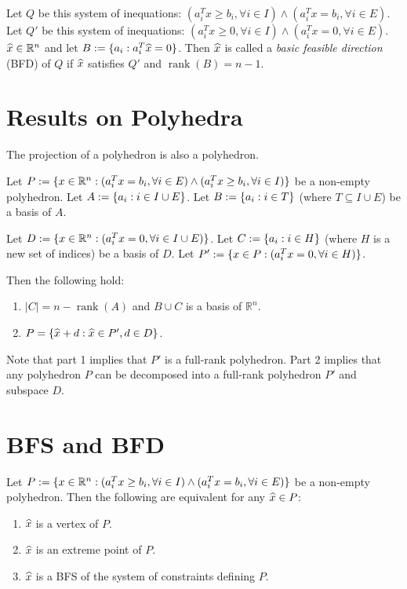 \documentclass[a4paper, 12pt, fleqn]{article}
\newenvironment*{tightenum}{\begin{enumerate}[noitemsep]}{\end{enumerate}}
\DeclareMathOperator{\rank}{rank}
\begin{document}
\begin{definition}[BFD]
Let $Q$ be this system of inequations:
$(a_i^Tx \ge b_i, \forall i \in I) \wedge (a_i^Tx = b_i, \forall i \in E)$.
Let $Q'$ be this system of inequations:
$(a_i^Tx \ge 0, \forall i \in I) \wedge (a_i^Tx = 0, \forall i \in E)$.
$\widehat{x} \in \mathbb{R}^n$ and let $B := \{a_i: a_i^T\widehat{x} = 0\}$.
Then $\widehat{x}$ is called a \emph{basic feasible direction} (BFD) of $Q$ if
$\widehat{x}$ satisfies $Q'$ and $\rank(B) = n-1$.
\end{definition}

\section{Results on Polyhedra}

\begin{theorem}
\label{thm:fme}
The projection of a polyhedron is also a polyhedron.
\end{theorem}

\begin{theorem}
Let $P := \{x \in \mathbb{R}^n: (a_i^Tx = b_i, \forall i \in E) \wedge (a_i^Tx \ge b_i, \forall i \in I)\}$
be a non-empty polyhedron. Let $A := \{a_i: i \in I \cup E\}$.
Let $B := \{a_i: i \in T\}$ (where $T \subseteq I \cup E$) be a basis of $A$.

Let $D := \{x \in \mathbb{R}^n: (a_i^Tx = 0, \forall i \in I \cup E)\}$.
Let $C := \{a_i: i \in H\}$ (where $H$ is a new set of indices) be a basis of $D$.
Let $P' := \{x \in P: (a_i^Tx = 0, \forall i \in H)\}$.

Then the following hold:
\begin{tightenum}
\item $|C| = n - \rank(A)$ and $B \cup C$ is a basis of $\mathbb{R}^n$.
\item $P = \{\widehat{x} + d: \widehat{x} \in P', d \in D\}$.
\end{tightenum}

Note that part 1 implies that $P'$ is a full-rank polyhedron.
Part 2 implies that any polyhedron $P$ can be decomposed into a full-rank polyhedron $P'$ and subspace $D$.
\end{theorem}

\section{BFS and BFD}

\begin{theorem}
Let $P := \{x \in \mathbb{R}^n: (a_i^Tx \ge b_i, \forall i \in I) \wedge (a_i^Tx = b_i, \forall i \in E)\}$
be a non-empty polyhedron. Then the following are equivalent for any $\widehat{x} \in P$:
\begin{tightenum}
\item $\widehat{x}$ is a vertex of $P$.
\item $\widehat{x}$ is an extreme point of $P$.
\item $\widehat{x}$ is a BFS of the system of constraints defining $P$.
\end{tightenum}
\end{theorem}
\end{document}
